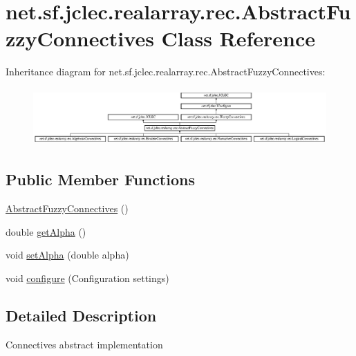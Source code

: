 \hypertarget{classnet_1_1sf_1_1jclec_1_1realarray_1_1rec_1_1_abstract_fuzzy_connectives}{\section{net.\-sf.\-jclec.\-realarray.\-rec.\-Abstract\-Fuzzy\-Connectives Class Reference}
\label{classnet_1_1sf_1_1jclec_1_1realarray_1_1rec_1_1_abstract_fuzzy_connectives}
}
Inheritance diagram for net.\-sf.\-jclec.\-realarray.\-rec.\-Abstract\-Fuzzy\-Connectives\-:\begin{figure}[H]
\begin{center}
\leavevmode
\includegraphics[height=2.208202cm]{classnet_1_1sf_1_1jclec_1_1realarray_1_1rec_1_1_abstract_fuzzy_connectives}
\end{center}
\end{figure}
\subsection*{Public Member Functions}
\begin{DoxyCompactItemize}
\item 
\hyperlink{classnet_1_1sf_1_1jclec_1_1realarray_1_1rec_1_1_abstract_fuzzy_connectives_ad4297b3bf30901127009d31637bfae1f}{Abstract\-Fuzzy\-Connectives} ()
\item 
double \hyperlink{classnet_1_1sf_1_1jclec_1_1realarray_1_1rec_1_1_abstract_fuzzy_connectives_aff5d878d9ceec7f839468d1cb716dfec}{get\-Alpha} ()
\item 
void \hyperlink{classnet_1_1sf_1_1jclec_1_1realarray_1_1rec_1_1_abstract_fuzzy_connectives_a45e699498fb9c6009e8ea066837862cc}{set\-Alpha} (double alpha)
\item 
void \hyperlink{classnet_1_1sf_1_1jclec_1_1realarray_1_1rec_1_1_abstract_fuzzy_connectives_a35538e69d56a5f2f01bdb8d485551165}{configure} (Configuration settings)
\end{DoxyCompactItemize}


\subsection{Detailed Description}
Connectives abstract implementation

